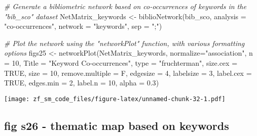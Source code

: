 \documentclass[
]{article}
\newenvironment{Shaded}{\begin{snugshade}}{\end{snugshade}}
\newcommand{\AttributeTok}[1]{\textcolor[rgb]{0.77,0.63,0.00}{#1}}
\newcommand{\CommentTok}[1]{\textcolor[rgb]{0.56,0.35,0.01}{\textit{#1}}}
\newcommand{\ConstantTok}[1]{\textcolor[rgb]{0.00,0.00,0.00}{#1}}
\newcommand{\DecValTok}[1]{\textcolor[rgb]{0.00,0.00,0.81}{#1}}
\newcommand{\FloatTok}[1]{\textcolor[rgb]{0.00,0.00,0.81}{#1}}
\newcommand{\FunctionTok}[1]{\textcolor[rgb]{0.00,0.00,0.00}{#1}}
\newcommand{\NormalTok}[1]{#1}
\newcommand{\OtherTok}[1]{\textcolor[rgb]{0.56,0.35,0.01}{#1}}
\newcommand{\StringTok}[1]{\textcolor[rgb]{0.31,0.60,0.02}{#1}}
\begin{document}
\begin{Shaded}
\begin{Highlighting}[]
\CommentTok{\# Generate a bibliometric network based on co{-}occurrences of keywords in the "bib\_sco" dataset}
\NormalTok{NetMatrix\_keywords }\OtherTok{\textless{}{-}} \FunctionTok{biblioNetwork}\NormalTok{(bib\_sco, }\AttributeTok{analysis =} \StringTok{"co{-}occurrences"}\NormalTok{, }\AttributeTok{network =} \StringTok{"keywords"}\NormalTok{, }\AttributeTok{sep =} \StringTok{";"}\NormalTok{)}

\CommentTok{\# Plot the network using the "networkPlot" function, with various formatting options}
\NormalTok{figs25 }\OtherTok{\textless{}{-}} \FunctionTok{networkPlot}\NormalTok{(NetMatrix\_keywords, }\AttributeTok{normalize=}\StringTok{"association"}\NormalTok{, }\AttributeTok{n =} \DecValTok{10}\NormalTok{, }
                     \AttributeTok{Title =} \StringTok{"Keyword Co{-}occurrences"}\NormalTok{, }\AttributeTok{type =} \StringTok{"fruchterman"}\NormalTok{, }
                     \AttributeTok{size.cex =} \ConstantTok{TRUE}\NormalTok{, }\AttributeTok{size =} \DecValTok{10}\NormalTok{, }\AttributeTok{remove.multiple =}\NormalTok{ F, }
                     \AttributeTok{edgesize =} \DecValTok{4}\NormalTok{, }\AttributeTok{labelsize =} \DecValTok{3}\NormalTok{, }\AttributeTok{label.cex =} \ConstantTok{TRUE}\NormalTok{, }
                     \AttributeTok{edges.min =} \DecValTok{2}\NormalTok{, }\AttributeTok{label.n =} \DecValTok{10}\NormalTok{, }\AttributeTok{alpha =} \FloatTok{0.3}\NormalTok{)}
\end{Highlighting}
\end{Shaded}

\texttt{[image: zf\_sm\_code\_files/figure-latex/unnamed-chunk-32-1.pdf]}

\hypertarget{fig-s26---thematic-map-based-on-keywords}{%
\subsection{fig s26 - thematic map based on
keywords}\label{fig-s26---thematic-map-based-on-keywords}}
\end{document}
